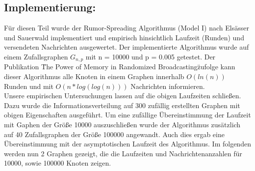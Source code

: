 \documentclass[12pt,a4paper]{report}
\begin{document}
\subsection*{Implementierung:}
Für diesen Teil wurde der Rumor-Spreading Algorithmus (Model I) nach Elsässer und Sauerwald implementiert und empirisch hinsichtlich Laufzeit (Runden) und versendeten Nachrichten ausgewertet. Der implementierte Algorithmus wurde auf einem 
Zufallsgraphen $G_{n,p}$ mit n = 10000 und p = 0.005 getestet.
Der Publikation \"The Power of Memory in Randomized Broadcasting\" zufolge kann dieser Algorithmus alle Knoten in einem
Graphen innerhalb $O(ln(n))$ Runden und mit $O(n * log(log(n)))$ Nachrichten informieren.\\
Unsere empirischen Untersuchungen lassen auf die obigen Laufzeiten schließen.
Dazu wurde die Informationsverteilung auf 300 zufällig erstellten Graphen mit obigen Eigenschaften ausgeführt.
Um eine zufällige Übereinstimmung der Laufzeit mit Gaphen der Größe 10000 auszuschließen wurde der Algorithmus
zusätzlich auf 40 Zufallsgraphen der Größe 100000 angewandt. Auch dies ergab eine Übereinstimmung mit der asymptotischen
Laufzeit des Algorithmus. Im folgenden werden nun 2 Graphen gezeigt, die die Laufzeiten und Nachrichtenanzahlen für 10000, sowie 100000 Knoten zeigen.



\end{document}
